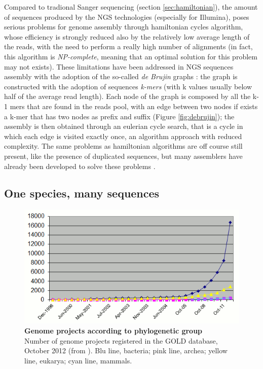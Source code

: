 Compared to tradional Sanger sequencing (section \ref{sec:hamiltonian}), the amount of sequences produced by the NGS technologies (especially for Illumina), poses serious problems for genome assembly through hamiltonian cycles algorithm, whose efficiency is strongly reduced also by the relatively low average length of the reads, with the need to perform a really high number of alignments (in fact, this algorithm is \textit{NP-complete}, meaning that an optimal solution for this problem may not exists). These limitations have been addressed in NGS sequences assembly with the adoption of the so-called \textit{de Brujin} graphs \cite{compeau2011apply}: the graph is constructed with the adoption of sequences \textit{k-mers} (with k values usually below half of the average read length). Each node of the graph is composed by all the k-1 mers that are found in the reads pool, with an edge between two nodes if exists a k-mer that has two nodes as prefix and suffix (Figure \ref{fig:debrujin}); the assembly is then obtained through an eulerian cycle search, that is a cycle in which each edge is visited exactly once, an algorithm approach with reduced complexity. The same problems as hamiltonian algorithms are off course still present, like the presence of duplicated sequences, but many assemblers have already been developed to solve these problems \cite{simpson2009abyss}\cite{boisvert2010ray}\cite{zerbino2008velvet}. 

\subsection{One species, many sequences}
\begin{figure}[!tb]
	\center
    \includegraphics[width=1\textwidth]{figures/Introduction/thesis_10}
	\caption{\label{fig:gold}\textbf{Genome projects according to phylogenetic group }\\
			Number of genome projects registered in the GOLD database, October 2012 (from \cite{gold}). Blu line, bacteria; pink line, archea; yellow line, eukarya; cyan line, mammals.}
\end{figure}

